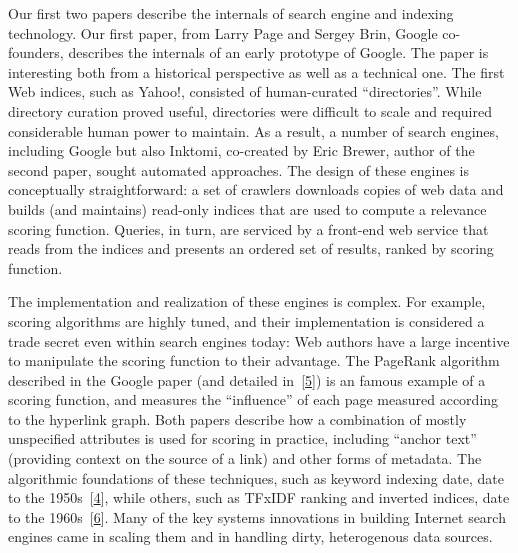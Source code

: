 \documentclass[b5paper,11pt,twoside,openright]{book}
\begin{document}
Our first two papers describe the internals of search engine and
indexing technology. Our first paper, from Larry Page and Sergey Brin,
Google co-founders, describes the internals of an early prototype of
Google. The paper is interesting both from a historical perspective as
well as a technical one. The first Web indices, such as Yahoo!,
consisted of human-curated ``directories''. While directory curation
proved useful, directories were difficult to scale and required
considerable human power to maintain. As a result, a number of search
engines, including Google but also Inktomi, co-created by Eric Brewer,
author of the second paper, sought automated approaches. The design of
these engines is conceptually straightforward: a set of crawlers
downloads copies of web data and builds (and maintains) read-only
indices that are used to compute a relevance scoring function. Queries,
in turn, are serviced by a front-end web service that reads from the
indices and presents an ordered set of results, ranked by scoring
function.

The implementation and realization of these engines is complex. For
example, scoring algorithms are highly tuned, and their implementation
is considered a trade secret even within search engines today: Web
authors have a large incentive to manipulate the scoring function to
their advantage. The PageRank algorithm described in the Google paper
(and detailed in~{{[}\protect\hyperlink{ref-pagerank}{5}{]}}) is an
famous example of a scoring function, and measures the ``influence'' of
each page measured according to the hyperlink graph. Both papers
describe how a combination of mostly unspecified attributes is used for
scoring in practice, including ``anchor text'' (providing context on the
source of a link) and other forms of metadata. The algorithmic
foundations of these techniques, such as keyword indexing date, date to
the 1950s~{{[}\protect\hyperlink{ref-luhn}{4}{]}}, while others, such as
TFxIDF ranking and inverted indices, date to the
1960s~{{[}\protect\hyperlink{ref-salton-indexing}{6}{]}}. Many of the
key systems innovations in building Internet search engines came in
scaling them and in handling dirty, heterogenous data sources.
\end{document}
